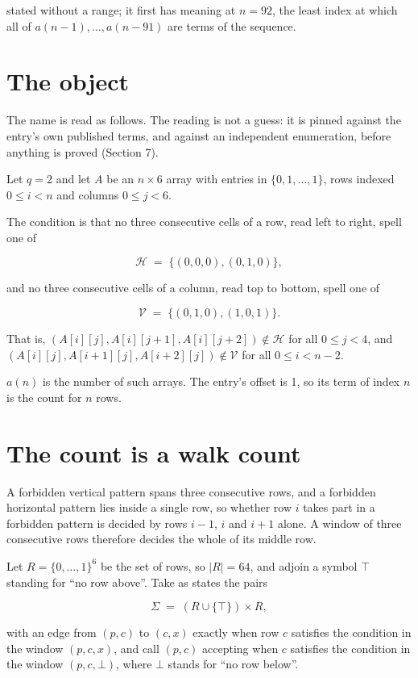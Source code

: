 \documentclass[11pt]{article}
\theoremstyle{definition}
\begin{document}
stated without a range; it first has meaning at $n = 92$, the least index at which all of $a(n-1),\dots,a(n-91)$ are terms of the sequence.

\section{The object}

The name is read as follows. The reading is not a guess: it is pinned against the entry's own published terms, and against an independent enumeration, before anything is proved (Section 7).

Let $q = 2$ and let $A$ be an $n \times 6$ array with entries in $\{0,1,\dots,1\}$, rows indexed $0 \le i < n$ and columns $0 \le j < 6$.

The condition is that no three consecutive cells of a row, read left to right, spell one of

\[\mathcal{H} \;=\; \{(0,0,0), (0,1,0)\},\]

and no three consecutive cells of a column, read top to bottom, spell one of

\[\mathcal{V} \;=\; \{(0,1,0), (1,0,1)\}.\]

That is, $(A[i][j],A[i][j{+}1],A[i][j{+}2]) \notin \mathcal{H}$ for all $0 \le j < 4$, and $(A[i][j],A[i{+}1][j],A[i{+}2][j]) \notin \mathcal{V}$ for all $0 \le i < n-2$.

$a(n)$ is the number of such arrays. The entry's offset is 1, so its term of index $n$ is the count for $n$ rows.

\section{The count is a walk count}

A forbidden vertical pattern spans three consecutive rows, and a forbidden horizontal pattern lies inside a single row, so whether row $i$ takes part in a forbidden pattern is decided by rows $i-1$, $i$ and $i+1$ alone. A window of three consecutive rows therefore decides the whole of its middle row.

Let $R = \{0,\dots,1\}^{6}$ be the set of rows, so $|R| = 64$, and adjoin a symbol $\top$ standing for ``no row above''. Take as states the pairs

\[\Sigma \;=\; (R \cup \{\top\}) \times R,\]

with an edge from $(p,c)$ to $(c,x)$ exactly when row $c$ satisfies the condition in the window $(p,c,x)$, and call $(p,c)$ accepting when $c$ satisfies the condition in the window $(p,c,\bot)$, where $\bot$ stands for ``no row below''.
\end{document}
